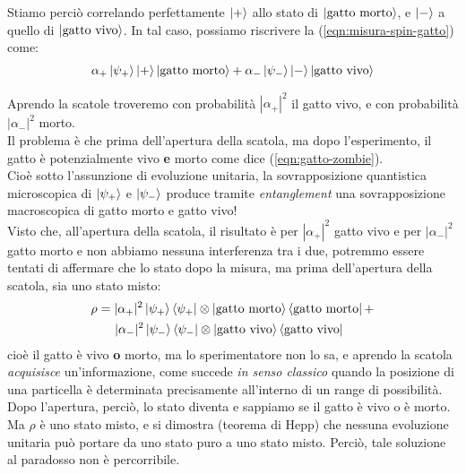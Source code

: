 \documentclass[../../FisicaTeorica.tex]{subfiles}
\begin{document}
Stiamo perciò correlando perfettamente $\Ket{+}$ allo stato di $\Ket{\text{gatto morto}}$, e $\Ket{-}$ a quello di $\Ket{\text{gatto vivo}}$. In tal caso, possiamo riscrivere la (\ref{eqn:misura-spin-gatto}) come:
\begin{align}
\alpha_+ \Ket{\psi_+} \Ket{+} \Ket{\text{gatto morto}} + \alpha_- \Ket{\psi_-} \Ket{-} \Ket{\text{gatto vivo}}
\label{eqn:gatto-zombie}
\end{align} 

Aprendo la scatole troveremo con probabilità $|\alpha_+|^2$ il gatto vivo, e con probabilità $|\alpha_-|^2$ morto.\\

Il problema è che prima dell'apertura della scatola, ma dopo l'esperimento, il gatto è potenzialmente vivo \textbf{e} morto come dice (\ref{eqn:gatto-zombie}).\\
Cioè sotto l'assunzione di evoluzione unitaria, la sovrapposizione quantistica microscopica di $\Ket{\psi_+}$ e $\Ket{\psi_-}$ produce tramite \textit{entanglement} una sovrapposizione macroscopica di gatto morto e gatto vivo!\\

Visto che, all'apertura della scatola, il risultato è per $|\alpha_+|^2$ gatto vivo e per $|\alpha_-|^2$ gatto morto e non abbiamo nessuna interferenza tra i due, potremmo essere tentati di affermare che lo stato dopo la misura, ma prima dell'apertura della scatola, sia uno stato misto:
\begin{align*}
\rho &= |\alpha_+|^2 \Ket{\psi_+}\Bra{\psi_+} \otimes \Ket{\text{gatto morto}}\Bra{\text{gatto morto}} + \\
&\quad \>\,|\alpha_-|^2 \Ket{\psi_-}\Bra{\psi_-} \otimes \Ket{\text{gatto vivo}}\Bra{\text{gatto vivo}}
\end{align*}
cioè il gatto è vivo \textbf{o} morto, ma lo sperimentatore non lo sa, e aprendo la scatola \textit{acquisisce} un'informazione, come succede \textit{in senso classico} quando la posizione di una particella è determinata precisamente all'interno di un range di possibilità.\\
Dopo l'apertura, perciò, lo stato diventa  e sappiamo se il gatto è vivo o è morto.\\

Ma $\rho$ è uno stato misto, e si dimostra (teorema di Hepp) che nessuna evoluzione unitaria può portare da uno stato puro a uno stato misto. Perciò, tale soluzione  al paradosso non è percorribile.\\
\end{document}
